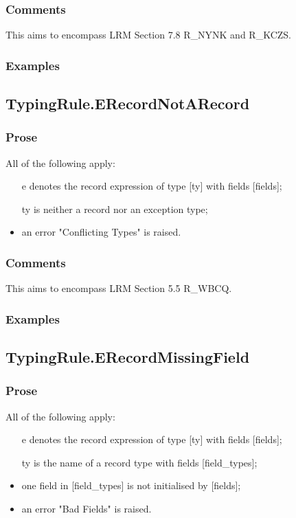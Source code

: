 \documentclass{book}
\begin{document}
  \subsubsection{Comments}
  This aims to encompass LRM Section 7.8 R\_NYNK and R\_KCZS.

  \subsubsection{Examples}

\subsection{TypingRule.ERecordNotARecord}

  \subsubsection{Prose}
  All of the following apply:
  \begin{itemize}
  \item  [e] denotes the record expression of type [ty] with fields [fields];
  \item  [ty] is neither a record nor an exception type;
  \item  an error "Conflicting Types" is raised.
  \end{itemize}

  \subsubsection{Comments}
  This aims to encompass LRM Section 5.5 R\_WBCQ.

  \subsubsection{Examples}

\subsection{TypingRule.ERecordMissingField}

  \subsubsection{Prose}
  All of the following apply:
  \begin{itemize}
  \item  [e] denotes the record expression of type [ty] with fields [fields];
  \item  [ty] is the name of a record type with fields [field\_types];
  \item  one field in [field\_types] is not initialised by [fields];
  \item  an error "Bad Fields" is raised.
  \end{itemize}
\end{document}
